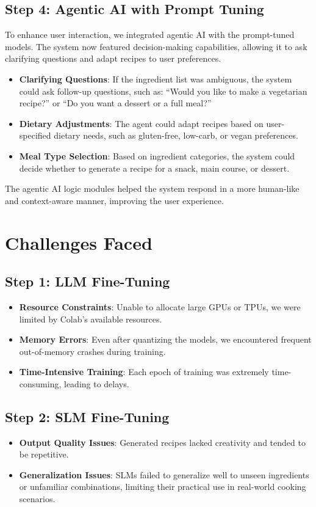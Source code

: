 \documentclass[letterpaper,11pt]{report}
\begin{document}
\subsection{Step 4: Agentic AI with Prompt Tuning}

To enhance user interaction, we integrated agentic AI with the prompt-tuned models. The system now featured decision-making capabilities, allowing it to ask clarifying questions and adapt recipes to user preferences.

\begin{itemize}
\item \textbf{Clarifying Questions}: If the ingredient list was ambiguous, the system could ask follow-up questions, such as: “Would you like to make a vegetarian recipe?” or “Do you want a dessert or a full meal?”
\item \textbf{Dietary Adjustments}: The agent could adapt recipes based on user-specified dietary needs, such as gluten-free, low-carb, or vegan preferences.
\item \textbf{Meal Type Selection}: Based on ingredient categories, the system could decide whether to generate a recipe for a snack, main course, or dessert.
\end{itemize}

The agentic AI logic modules helped the system respond in a more human-like and context-aware manner, improving the user experience.

\section{Challenges Faced}
\subsection{Step 1: LLM Fine-Tuning}
\begin{itemize}
    \item \textbf{Resource Constraints}: Unable to allocate large GPUs or TPUs, we were limited by Colab's available resources.
    \item \textbf{Memory Errors}: Even after quantizing the models, we encountered frequent out-of-memory crashes during training.
    \item \textbf{Time-Intensive Training}: Each epoch of training was extremely time-consuming, leading to delays.
\end{itemize}

\subsection{Step 2: SLM Fine-Tuning}
\begin{itemize}
    \item \textbf{Output Quality Issues}: Generated recipes lacked creativity and tended to be repetitive.
    \item \textbf{Generalization Issues}: SLMs failed to generalize well to unseen ingredients or unfamiliar combinations, limiting their practical use in real-world cooking scenarios.
\end{itemize}
\end{document}
